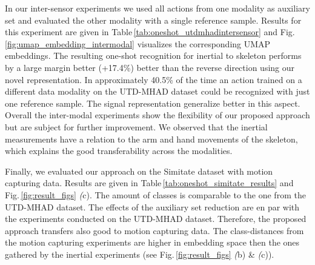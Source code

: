 \documentclass[10pt,conference,a4paper]{IEEEtran}
\def\figname{Fig.\,}
\def\tabname{Table\,}
\begin{document}
In our inter-sensor experiments we used all actions from one modality as auxiliary set and evaluated the other modality with a single reference sample. Results for this experiment are given in \tabname \ref{tab:oneshot_utdmhadintersensor} and \figname \ref{fig:umap_embedding_intermodal} visualizes the corresponding UMAP embeddings. The resulting one-shot recognition for inertial to skeleton performs by a large margin better (+17.4\%) better than the reverse direction using our novel representation. In approximately 40.5\% of the time an action trained on a different data modality on the UTD-MHAD dataset could be recognized with just one reference sample.
The signal representation \cite{memmesheimer2020gimme} generalize better in this aspect.
Overall the inter-modal experiments show the flexibility of our proposed approach but are subject for further improvement. We observed that the inertial measurements have a relation to the arm and hand movements of the skeleton, which explains the good transferability across the modalities.



Finally, we evaluated our approach on the Simitate dataset with motion capturing data. Results are given in \tabname \ref{tab:oneshot_simitate_results} and \figname \ref{fig:result_figs} {\textit(c)}. The amount of classes is comparable to the one from the UTD-MHAD dataset. The effects of the auxiliary set reduction are en par with the experiments conducted on the UTD-MHAD dataset. Therefore, the proposed approach transfers also good to motion capturing data. The class-distances from the motion capturing experiments are higher in embedding space then the ones gathered by the inertial experiments (see \figname \ref{fig:result_figs} {\textit(b)} \& {\textit(c)}). 

 
 
\end{document}
